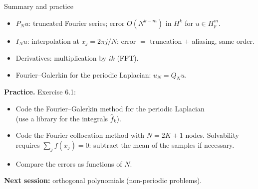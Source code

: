 \begin{frame}{Summary and practice}
    \begin{itemize}
        \item $P_N u$: truncated Fourier series; error $O(N^{k-m})$ in $H^k$ for $u \in H^m_p$.
        \item $I_N u$: interpolation at $x_j = 2\pi j/N$; error $=$ truncation $+$ aliasing, same order.
        \item Derivatives: multiplication by $ik$ (FFT).
        \item Fourier--Galerkin for the periodic Laplacian: $u_N = Q_N u$.
    \end{itemize}
    \bigskip
    \textbf{Practice.} Exercise 6.1:
    \begin{itemize}
        \item Code the Fourier--Galerkin method for the periodic Laplacian\\ (use a library for the integrals $\hat f_k$).
        \item Code the Fourier collocation method with $N = 2K+1$ nodes. Solvability requires $\sum_j f(x_j) = 0$: subtract the mean of the samples if necessary.
        \item Compare the errors as functions of $N$.
    \end{itemize}
    \bigskip
    \textbf{Next session:} orthogonal polynomials (non-periodic problems).
\end{frame}
